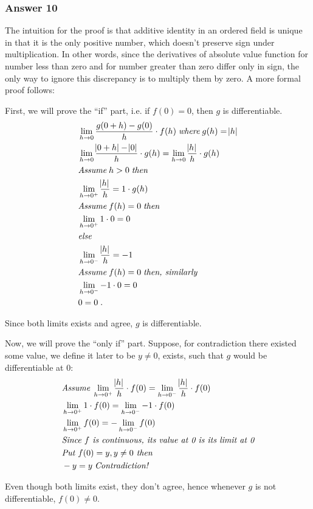 \documentclass[a4paper]{article}
\begin{document}
\subsubsection{Answer 10}
\label{sec:orgheadline15}
The intuition for the proof is that additive identity in an ordered field is
unique in that it is the only positive number, which doesn't preserve sign
under multiplication.  In other words, since the derivatives of absolute value
function for number less than zero and for number greater than zero differ
only in sign, the only way to ignore this discrepancy is to multiply them
by zero.  A more formal proof follows:

First, we will prove the ``if'' part, i.e. if \(f(0) = 0\), then \(g\) is
differentiable.
\begin{align*}
  &\lim_{h \to 0}\frac{g(0 + h) - g(0)}{h}\cdot f(h) \;\textit{where}\; g(h) = \abs{h} \\
  &\lim_{h \to 0}\frac{\abs{0 + h} - \abs{0}}{h} \cdot g(h) = 
  \lim_{h \to 0}\frac{\abs{h}}{h} \cdot g(h) \\
  &\textit{Assume}\; h > 0 \;\textit{then} \\
  &\lim_{h \to 0^+}\frac{\abs{h}}{h} = 1 \cdot g(h) \\
  &\textit{Assume}\; f(h) = 0 \;\textit{then} \\
  &\lim_{h \to 0^+} 1 \cdot 0 = 0 \\
  &\textit{else} \\
  &\lim_{h \to 0^-}\frac{\abs{h}}{h} = -1 \\
  &\textit{Assume}\; f(h) = 0\; \textit{then, similarly} \\
  &\lim_{h \to 0^-} -1 \cdot 0 = 0 \\
  &0 = 0\;.
\end{align*}

Since both limits exists and agree, \(g\) is differentiable.

Now, we will prove the ``only if'' part.  Suppose, for contradiction there
existed some value, we define it later to be \(y \neq 0\), exists, such that
\(g\) would be differentiable at 0:
\begin{align*}
  &\textit{Assume}\; \lim_{h \to 0^+} \frac{\abs{h}}{h} \cdot f(0) =
  \lim_{h \to 0^-} \frac{\abs{h}}{h} \cdot f(0) \\
  &\lim_{h \to 0^+} 1 \cdot f(0) = \lim_{h \to 0^-} -1 \cdot f(0) \\
  &\lim_{h \to 0^+} f(0) = -\lim_{h \to 0^-} f(0) \\
  &\textit{Since $f$ is continuous, its value at 0 is its limit at 0} \\
  &\textit{Put $f(0) = y, y \neq 0$ then}\\
  &-y = y\; \textit{Contradiction!}
\end{align*}

Even though both limits exist, they don't agree, hence whenever \(g\) is not
differentiable, \(f(0) \neq 0\).
\end{document}

